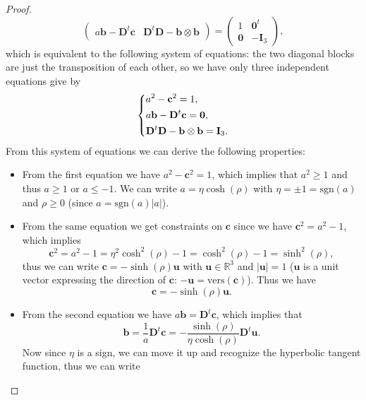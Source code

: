 \begin{proof}
\[\begin{pmatrix}
            a \mathbf{b} - \mathbf{D}^t \mathbf{c} & \mathbf{D}^t \mathbf{D} - \mathbf{b} \otimes \mathbf{b}
        \end{pmatrix}= \begin{pmatrix}
            1          & \mathbf{0}^t  \\
            \mathbf{0} & -\mathbf{I}_3
        \end{pmatrix},
    \]
    which is equivalent to the following system of equations: the two diagonal blocks are just the transposition of each other, so we have only three independent equations give by
    \[
        \begin{dcases}
            a^2 - \mathbf{c}^2 = 1,                              \\
            a \mathbf{b} - \mathbf{D}^t \mathbf{c} = \mathbf{0}, \\
            \mathbf{D}^t \mathbf{D} - \mathbf{b} \otimes \mathbf{b} = \mathbf{I}_3.
        \end{dcases}
    \]
    From this system of equations we can derive the following properties:
    \begin{itemize}
        \item From the first equation we have \(a^2 - \mathbf{c}^2 = 1\), which implies that \(a^2 \geq 1\) and thus \(a \geq 1\) or \(a \leq -1\). We can write \(a = \eta \cosh(\rho)\) with \(\eta = \pm 1 = \text{sgn}(a)\) and \(\rho \geq 0\) (since \(a = \text{sgn}(a)\vert a \vert\)).
        \item From the same equation we get constraints on \(\mathbf{c}\) since we have \(\mathbf{c}^2 = a^2 - 1\), which implies
              \[
                  \mathbf{c}^2 = a^2 - 1 = \eta^2 \cosh^2(\rho) - 1 = \cosh^2(\rho) - 1 = \sinh^2(\rho),
              \]
              thus we can write \(\mathbf{c} = -\sinh(\rho) \mathbf{u}\) with \(\mathbf{u} \in \mathbb{R}^3\) and \(\vert \mathbf{u} \vert = 1\) (\(\mathbf{u}\) is a unit vector expressing the direction of \(\mathbf{c}\): \(- \mathbf{u} = \text{vers}(\mathbf{c})\)). Thus we have
              \[
                  \mathbf{c} = -\sinh(\rho) \mathbf{u}.
              \]
        \item From the second equation we have \(a \mathbf{b} = \mathbf{D}^t \mathbf{c}\), which implies that
              \[
                  \mathbf{b} = \frac{1}{a} \mathbf{D}^t \mathbf{c} = -\frac{\sinh(\rho)}{\eta \cosh(\rho)} \mathbf{D}^t \mathbf{u}.
              \]
              Now since \(\eta\) is a sign, we can move it up and recognize the hyperbolic tangent function, thus we can write

\end{itemize}
\end{proof}
